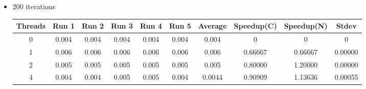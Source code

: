 \begin{itemize}
\begin{center}
 \end{center} 
\item 200 iterations
\begin{center}
 \begin{adjustbox}{width=\columnwidth, center} 
 \begin{tabular}{ | |c | c c c c c | c | c c | c | |} \hline 
 Threads & Run 1 & Run 2 & Run 3 & Run 4 & Run 5 & Average & Speedup(C) & Speedup(N) & Stdev \\ [0.5ex] 
 \hline 
 \hline 
0& 0.004 & 0.004 & 0.004 & 0.004 & 0.004 & 0.004 & 0 & 0 & 0\\ 
 \hline
1& 0.006 & 0.006 & 0.006 & 0.006 & 0.006 & 0.006 & 0.66667 & 0.66667 & 0.00000\\ 
 \hline
2& 0.005 & 0.005 & 0.005 & 0.005 & 0.005 & 0.005 & 0.80000 & 1.20000 & 0.00000\\ 
 \hline
4& 0.004 & 0.004 & 0.005 & 0.005 & 0.004 & 0.0044 & 0.90909 & 1.13636 & 0.00055\\ 
 \hline
\end{tabular} 
 \end{adjustbox} 
 \end{center} 
\end{itemize}
